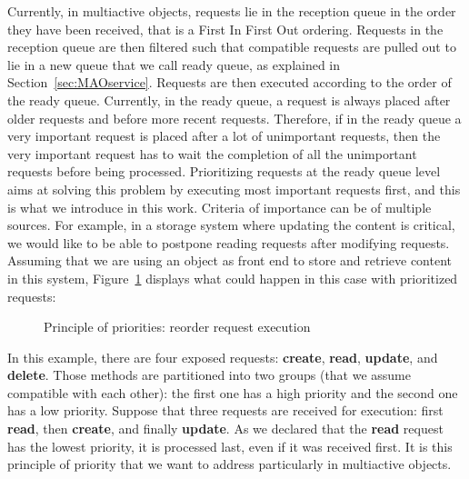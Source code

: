 \documentclass[11pt]{report}
\begin{document}
Currently, in multiactive objects, requests lie in the reception queue in the order they have been received, that is a First In First Out ordering. Requests in the reception queue are then filtered such that compatible requests are pulled out to lie in a new queue that we call ready queue, as explained in Section~\ref{sec:MAOservice}. Requests are then executed according to the order of the ready queue. Currently, in the ready queue, a request is always placed after older requests and before more recent requests. Therefore, if in the ready queue a very important request is placed after a lot of unimportant requests, then the very important request has to wait the completion of all the unimportant requests before being processed. Prioritizing requests at the ready queue level aims at solving this problem by executing most important requests first, and this is what we introduce in this work. Criteria of importance can be of multiple sources. For example, in a storage system where updating the content is critical, we would like to be able to postpone reading requests after modifying requests. Assuming that we are using an object as front end to store and retrieve content in this system, Figure~\ref{fig:priority_principle} displays what could happen in this case with prioritized requests:

\begin{figure}[ht]
      \caption{Principle of priorities: reorder request execution}
      \label{fig:priority_principle}
\end{figure}

In this example, there are four exposed requests: \textbf{create}, \textbf{read}, \textbf{update}, and \textbf{delete}. Those methods are partitioned into two groups (that we assume compatible with each other): the first one has a high priority and the second one has a low priority. Suppose that three requests are received for execution: first \textbf{read}, then \textbf{create}, and finally \textbf{update}. As we declared that the \textbf{read} request has the lowest priority, it is processed last, even if it was received first. It is this principle of priority that we want to address particularly in multiactive objects.
\end{document}
